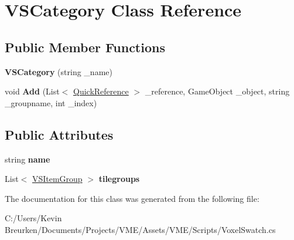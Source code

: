 \hypertarget{class_v_s_category}{}\section{V\+S\+Category Class Reference}
\label{class_v_s_category}
\subsection*{Public Member Functions}
\begin{DoxyCompactItemize}
\item 
{\bfseries V\+S\+Category} (string \+\_\+name)\hypertarget{class_v_s_category_a6db0268109430e32946e1b881e25fb1e}{}\label{class_v_s_category_a6db0268109430e32946e1b881e25fb1e}

\item 
void {\bfseries Add} (List$<$ \hyperlink{class_quick_reference}{Quick\+Reference} $>$ \+\_\+reference, Game\+Object \+\_\+object, string \+\_\+groupname, int \+\_\+index)\hypertarget{class_v_s_category_ab47fe555eaf0001bff285bc0742e97ec}{}\label{class_v_s_category_ab47fe555eaf0001bff285bc0742e97ec}

\end{DoxyCompactItemize}
\subsection*{Public Attributes}
\begin{DoxyCompactItemize}
\item 
string {\bfseries name}\hypertarget{class_v_s_category_a62c882e1acf517e40f95da21742b55ea}{}\label{class_v_s_category_a62c882e1acf517e40f95da21742b55ea}

\item 
List$<$ \hyperlink{class_v_s_item_group}{V\+S\+Item\+Group} $>$ {\bfseries tilegroups}\hypertarget{class_v_s_category_a007f1f04b040d03bf86e0c5a0c5d9cd2}{}\label{class_v_s_category_a007f1f04b040d03bf86e0c5a0c5d9cd2}

\end{DoxyCompactItemize}


The documentation for this class was generated from the following file\+:\begin{DoxyCompactItemize}
\item 
C\+:/\+Users/\+Kevin Breurken/\+Documents/\+Projects/\+V\+M\+E/\+Assets/\+V\+M\+E/\+Scripts/Voxel\+Swatch.\+cs\end{DoxyCompactItemize}
